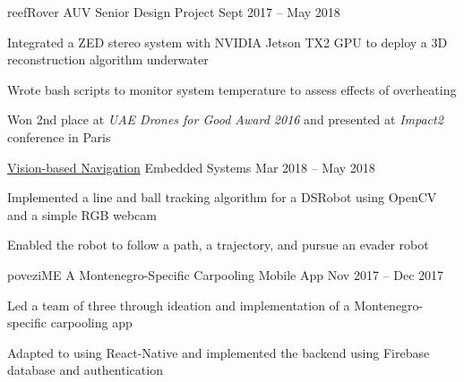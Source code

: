 

\begin{cventries}

	\projectwithsubtitle
		{reefRover AUV }
		{Senior Design Project}
		{Sept 2017 -- May 2018} %
		{
			\begin{cvitems} %
				\item {Integrated a ZED stereo system with NVIDIA Jetson TX2 GPU to deploy a 3D reconstruction algorithm underwater}
				\item {Wrote bash scripts to monitor system temperature to assess effects of overheating}
				\item {Won 2nd place at \textit{UAE Drones for Good Award 2016} and presented at \textit{Impact2} conference in Paris}
			\end{cvitems}
		}

	\projectwithsubtitle
		{\href{https://github.com/sherl0ck-/DSRobotContoller}{Vision-based Navigation} }
		{Embedded Systems}
		{Mar 2018 -- May 2018}
		{
			\begin{cvitems}
				\item{Implemented a line and ball tracking algorithm for a DSRobot using OpenCV and a simple RGB webcam}
				\item{Enabled the robot to follow a path, a trajectory, and pursue an evader robot}
			\end{cvitems}
		}

	\projectwithsubtitle
		{poveziME } %
		{A Montenegro-Specific Carpooling Mobile App} %
		{Nov 2017 -- Dec 2017} %
		{
			\begin{cvitems} %
				\item {Led a team of three through ideation and implementation of a Montenegro-specific carpooling app }
				\item {Adapted to using React-Native and implemented the backend using Firebase database and authentication}
			\end{cvitems}
		}


\end{cventries}
